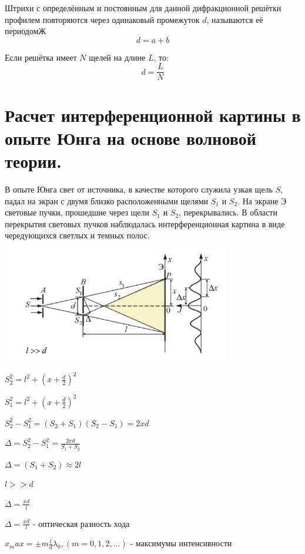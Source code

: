 \documentclass[12pt]{report}
\begin{document}
Штрихи с определённым и постоянным для данной дифракционной решётки профилем повторяются через одинаковый промежуток $d$, называются её периодомЖ
\[
    d = a + b
\]

Если решётка имеет $N$ щелей на длине $L$, то:
\[
    d = \dfrac{L}{N}
\]

\section{Расчет интерференционной картины в опыте Юнга на основе волновой теории.}
В опыте Юнга свет от источника, в качестве которого служила узкая щель $S$, падал на экран с двумя близко расположенными щелями $S_1$ и $S_2$. На экране Э световые пучки, прошедшие через щели $S_1$ и $S_2$, перекрывались.  В области перекрытия световых пучков наблюдалась интерференционная картина в виде чередующихся светлых и темных полос.

\begin{center}
    \includegraphics[width=100mm]{graphics/07.png}
\end{center}
\begin{center}
    $S^2 _2 = l^2 + (x + \frac{d}{2})^2 $
\end{center}
\begin{center}
    $S^2 _1 = l^2 + (x + \frac{d}{2})^2 $
\end{center}
\begin{center}
    $S^2 _2 - S^2 _1 = (S_2 + S_1)(S_2 - S_1) = 2xd $
\end{center}
\begin{center}
    $\Delta = S^2 _2 - S^2 _1 = \frac{2xd}{S_1 + S_2}$
\end{center}
\begin{center}
    $\Delta = (S_1 + S_2) ≈ 2l$
\end{center}
\begin{center}
    $l >> d$
\end{center}
\begin{center}
    $\Delta = \frac{xd}{l}$
\end{center}
\begin{center}
    $\Delta = \frac{xd}{l}$ - оптическая разность хода
\end{center}
\begin{center}
    $x_max = \pm m \frac{l}{d} \lambda_0, (m = 0, 1, 2, ...) $ - максимумы интенсивности
\end{center}
\end{document}
